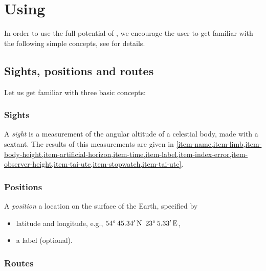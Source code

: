 \documentclass{ol-softwaremanual}
\begin{document}
\section{Using \thel}


In order to use the full potential of \thel, we encourage the user to get familiar with the following simple concepts, see \cite{bowditch2002the} for details. 

\subsection{Sights, positions and routes}

Let us get familiar with three basic concepts: 
\subsubsection{Sights} \label{section-sights} 

A \textit{sight} is a measurement of the angular altitude of a celestial body, made with a sextant. 
The results of this measurements are given in  \cref{item-name,item-limb,item-body-height,item-artificial-horizon,item-time,item-label,item-index-error,item-observer-height,item-tai-utc,item-stopwatch,item-tai-utc}. 


\subsubsection{Positions}  \label{section-positions} 

A \textit{position} a  location on the surface of the Earth, specified by 
\begin{itemize}
\item latitude and longitude, e.g., $54 \degree \, 45.34'\, \textrm{N}$ $23 \degree \, 5.33'\, \textrm{E}$,
\item a label (optional).
\end{itemize}
\subsubsection{Routes} \label{section-routes} 
\end{document}
